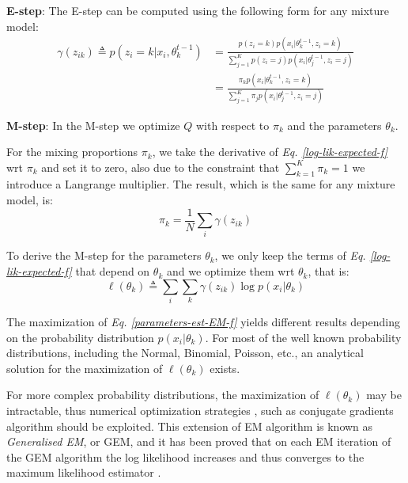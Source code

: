 \noindent
\textbf{E-step}: The E-step can be computed using the following form for any mixture model:
\begin{equation} \label{responsibilities-f}
  \begin{split}
	\gamma(z_{ik}) \triangleq p(z_{i}=k|x_{i},\theta_{k}^{t-1}) & = \frac{p(z_{i}=k)p(x_{i}|\theta_{k}^{t-1},z_{i}=k)}{\sum_{j=1}^{K} p(z_{i}=j)p(x_{i}|\theta_{j}^{t-1},z_{i}=j)} \\
					   & = \frac{\pi_{k}p(x_{i}|\theta_{k}^{t-1},z_{i}=k)}{\sum_{j=1}^{K} \pi_{j}p(x_{i}|\theta_{j}^{t-1},z_{i}=j)}
  \end{split}
\end{equation}

\noindent
\textbf{M-step}: In the M-step we optimize $Q$ with respect to $\pi_{k}$ and the parameters $\theta_{k}$.

For the mixing proportions $\pi_{k}$, we take the derivative of \emph{Eq. \ref{log-lik-expected-f}} wrt $\pi_{k}$ and set it to zero, also due to the constraint that $\sum_{k=1}^{K}\pi_{k} = 1$ we introduce a Langrange multiplier. The result, which is the same for any mixture model, is:
\begin{equation} \label{mixing-proportions-est-f}
		\pi_{k} = \frac{1}{N} \sum_{i} \gamma(z_{ik})
\end{equation}

To derive the M-step for the parameters $\theta_{k}$, we only keep the terms of \emph{Eq. \ref{log-lik-expected-f}} that depend on $\theta_{k}$ and we optimize them wrt $\theta_{k}$, that is:
\begin{equation} \label{parameters-est-EM-f}
		\ell(\theta_{k}) \triangleq \sum_{i} \sum_{k} \gamma(z_{ik}) \log p(x_{i}|\theta_{k})
\end{equation}

The maximization of \emph{Eq. \ref{parameters-est-EM-f}} yields different results depending on the probability distribution $p(x_{i}|\theta_{k})$. For most of the well known probability distributions, including the Normal, Binomial, Poisson, etc., an analytical solution for the maximization of $\ell(\theta_{k})$ exists. 

For more complex probability distributions, the maximization of $\ell(\theta_{k})$ may be intractable, thus numerical optimization strategies \citep{Nocedal2006}, such as conjugate gradients algorithm \citep{Hestenes1952} should be exploited. This extension of EM algorithm is known as \emph{Generalised EM}, or GEM, and it has been proved that on each EM iteration of the GEM algorithm the log likelihood increases and thus converges to the maximum likelihood estimator \citep{Wu1983}.